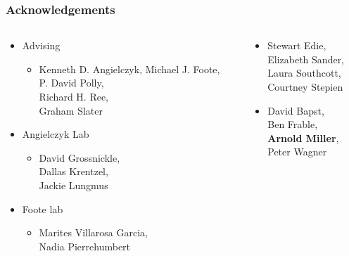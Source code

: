 \documentclass{beamer}
\begin{document}
\begin{frame}
  \frametitle{Acknowledgements}
  \begin{columns}
    \begin{column}{0.5\textwidth}
      \begin{itemize}
        \item Advising
          \begin{itemize}
            \item Kenneth D. Angielczyk, Michael J. Foote, \\P. David Polly, \\Richard H. Ree, \\Graham Slater
          \end{itemize}
        \item Angielczyk Lab
          \begin{itemize}
            \item {\small{David Grossnickle, \\Dallas Krentzel, \\Jackie Lungmus}}
          \end{itemize}
        \item Foote lab
          \begin{itemize}
            \item {\small{Marites Villarosa Garcia, \\Nadia Pierrehumbert}}
          \end{itemize}
      \end{itemize}
    \end{column}
    \begin{column}{0.5\textwidth}
      \begin{itemize}
        \item {\footnotesize{Stewart Edie, \\Elizabeth Sander, \\Laura Southcott, \\Courtney Stepien}}
        \item {\footnotesize{David Bapst, \\Ben Frable, \\\textbf{Arnold Miller}, \\Peter Wagner}}
      \end{itemize}


\end{column}
\end{columns}
\end{frame}
\end{document}
